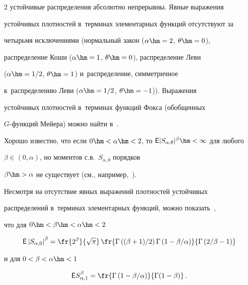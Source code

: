 \begin{multicols}{2}
устойчивые распределения абсолютно непрерывны. Явные выражения


устойчивых плотностей в~терминах элементарных функций отсутствуют за


четырьмя исключениями (нормальный закон ($\alpha\hm=2$, $\theta\hm=0$),


распределение Коши ($\alpha\hm=1$, $\theta\hm=0$), распределение Леви


($\alpha\hm=1/2$, $\theta\hm=1$) и~распределение, симметричное 


к~распределению Леви ($\alpha\hm=1/2$, $\theta\hm=-1$)). Выражения


устойчивых плотностей в~терминах функций Фокса (обобщенных


$G$-функ\-ций Мейера) можно найти в~\cite{Schneider1986, UchaikinZolotarev1999}.





Хорошо известно, что если $0\hm<\alpha\hm<2$, то ${\sf E}


|S_{\alpha,\theta}|^{\beta}\hm<\infty$ для любого


$\beta\in(0,\alpha)$, но моментов с.в.~$S_{\alpha,\theta}$ порядков


$\beta\hm>\alpha$ не существует (см., например,~\cite{Zolotarev1983}).


Несмотря на отсутствие явных выражений плотностей устойчивых


распределений в~терминах элементарных функций, можно показать~\cite{KorolevWeibull2016}, 


что для $0\hm<\beta\hm<\alpha\hm<2$


\begin{equation}


{\sf E}\left\vert S_{\alpha,0}\right\vert^{\beta}=\fr{2^{\beta}}{\sqrt{\pi}}\,


\fr{\Gamma\left(({\beta+1})/{2}\right)\Gamma\left(1-{\beta}/{\alpha}\right)}


{\Gamma\left({2}/{\beta}-1\right)}


\label{e4-kgz}


\end{equation}


и для $0<\beta<\alpha\hm< 1$


\begin{equation}


{\sf E}S_{\alpha,1}^{\beta}=


\fr{\Gamma\left(1-{\beta}/{\alpha}\right)}{\Gamma(1-\beta)}\,.



\end{equation}
\end{multicols}
